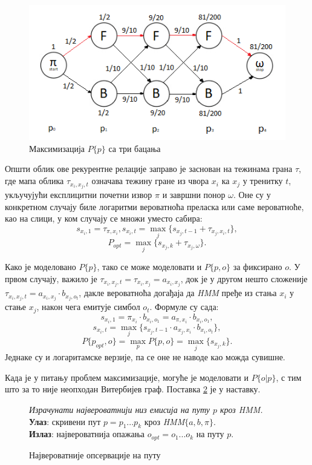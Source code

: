 \documentclass[12pt,oneside]{memoir}
\newenvironment{problem}[1][!ht]
{\renewcommand{\algorithmcfname}{Проблем}
\begin{figure}[!ht]
\centering
  \begin{minipage}{.94\linewidth}
	\begin{algorithm}[#1]%
  }{\end{algorithm}
  \end{minipage}
\end{figure}}
\begin{document}
\begin{CJK}{UTF8}{ipxm}
\begin{figure}[!ht]
  \centering
  \includegraphics[width=.9\textwidth]{tri_bacanja.png}
  \caption{Максимизација $P\{p\}$ са три бацања}
  \label{fig:tribac}
\end{figure}

Општи облик ове рекурентне релације заправо је заснован на тежинама грана $\tau$, где мапа облика $\tau_{x_i, x_j, t}$ означава тежину гране из чвора $x_i$ ка $x_j$ у тренитку $t$, укључујући експлицитни почетни извор $\pi$ и завршни понор $\omega$. Оне су у конкретном случају биле логаритми вероватноћа преласка или саме вероватноће, као на слици, у ком случају се множи уместо сабира: $$s_{x_i, 1} = \tau_{\pi, x_i}, s_{x_i, t} = \max_j \{s_{x_j, t-1} + \tau_{x_j, x_i, t}\},$$ $$P_{opt} = \max_j \{s_{x_j, k} + \tau_{x_j, \omega}\}.$$

Како је моделовано $P\{p\}$, тако се може моделовати и $P\{p, o\}$ за фиксирано $o$. У првом случају, важило је $\tau_{x_i, x_j, t} = \tau_{x_i, x_j} = a_{x_i, x_j}$, док је у другом нешто сложеније $\tau_{x_i, x_j, t} = a_{x_i, x_j} \cdot b_{x_j, o_t}$, дакле вероватноћа догађаја да \textit{HMM} пређе из стања $x_i$ у стање $x_j$, након чега емитује симбол $o_t$. Формуле су сада: $$s_{x_i, 1} = \pi_{x_i} \cdot b_{x_i, o_1} = a_{\pi, x_i} \cdot b_{x_i, o_1},$$ $$s_{x_i, t} = \max_j \{s_{x_j, t-1} \cdot a_{x_j, x_i} \cdot b_{x_i, o_t}\},$$ $$P\{p_{opt}, o\} = \max_p P\{p, o\} = \max_j \{s_{x_j, k}\}.$$ Једнаке су и логаритамске верзије, па се оне не наводе као можда сувишне.

Када је у питању проблем максимизације, могуће је моделовати и $P\{o | p\}$, с тим што за то није неопходан Витербијев граф. Поставка \ref{prob:maxpops} је у наставку.

\begin{problem}[H]
  \SetAlgoLined
  \textit{Израчунати највероватнији низ емисија на путу $p$ кроз \textit{HMM}.}\\
  \textbf{Улаз}: скривени пут $p = p_1...p_k$ кроз \textit{HMM}$\{a, b, \pi\}$.\\
  \textbf{Излаз}: највероватнија опажања $o_{opt} = o_1...o_k$ на путу $p$.
  \caption{Највероватније опсервације на путу}
  \label{prob:maxpops}
\end{problem}


\end{CJK}
\end{document}
